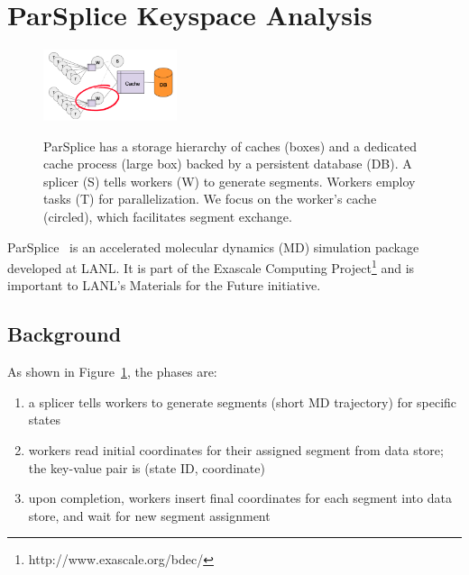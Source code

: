 \section{ParSplice Keyspace Analysis}
\label{sec:parsplice-keyspace-analysis}

\begin{figure}[t]
\centering
\noindent\includegraphics[width=0.35\textwidth]{figures/parsplice.png}\\
\caption{ParSplice has a storage hierarchy of caches (boxes) and a
dedicated cache process (large box) backed by a persistent database (DB). A splicer
(S) tells workers (W) to generate segments. Workers employ tasks (T) for
parallelization. We focus on the worker's cache (circled), which facilitates
segment exchange.
\label{fig:parsplice}}
\end{figure}

ParSplice~\cite{perez:jctc20150parsplice} is an accelerated molecular dynamics
(MD) simulation package developed at LANL. It is part of the Exascale Computing
Project\footnote{http://www.exascale.org/bdec/} and is important to LANL's
Materials for the Future initiative. 

\subsection{Background}

As shown in Figure~\ref{fig:parsplice}, the phases are:

\begin{enumerate}

  \item a splicer tells workers to generate segments (short MD trajectory) for
  specific states

  \item workers read initial coordinates for their assigned segment from data
  store; the key-value pair is (state ID, coordinate)

  \item upon completion, workers insert final coordinates for each segment into
  data store, and wait for new segment assignment

\end{enumerate}

